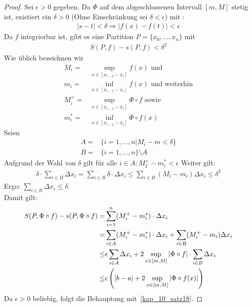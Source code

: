 \begin{proof}	
	 Sei $\epsilon > 0$ gegeben. Da $\Phi$ auf dem abgeschlossenen Intervall 
	$[m,M]$ stetig ist, existiert ein $\delta > 0$ 
	(Ohne Einschränkung sei $\delta < \epsilon$) mit :
	\begin{align*}
		\vert s - t\vert < \delta \Rightarrow \vert f(x) - f(t) \vert < \epsilon
	\end{align*}
	Da $f$ integrierbar ist, gibt es eine Partition $P = \{x_0, \hdots, x_n\}$
	mit 
	\begin{align*}
		S(P,f) - s(P,f) < \delta^2
	\end{align*}		
	Wie üblich bezeichnen wir 
	\begin{align*}
		M_i = & \sup_{x \in [x_{i-1}-x_i]} f(x) \text{ und } \\
		m_i = & \inf_{x \in [x_{i-1}-x_i]} f(x) \text{ und weiterhin} \\
		M_i^+ = & \sup_{x \in [x_{i-1}-x_i]} \Phi \circ f \text{ sowie } \\
		m_i^* = & \inf_{x \in [x_{i-1}-x_i]} \Phi \circ f(x)
	\end{align*}		
	Seien
	\begin{align*}
		A = & \{i = 1, \hdots, n \vert M_i -m < \delta \} \\
		B = & \{ i = 1, \hdots, n\} \setminus A
	\end{align*}
	Aufgrund der Wahl von $\delta$ gilt für alle $ i \in A: M_I^+ - m_i^* < \epsilon$
	Weiter gilt: 
	\begin{align*}
		\delta \cdot \sum_{i \in B} \Delta x_i = \sum_{i \in B} \delta \cdot \Delta x_i 
		\leq  \sum_{i \in B} (M_i - m_i) \Delta x_i \leq \delta^2
	\end{align*}
	Ergo: $\sum_{i \in B} \Delta x_i \leq \delta$. \\
	Damit gilt:
	\begin{align*}
		S(P, \Phi \circ f) - s(P, \Phi \circ f) = 
		& \sum_{i = 1}^n (M_i^+ - m_i^*) \cdot\Delta x_i  \\
		= & \sum_{i \in A} (M_i^+ - m_i^* ) \cdot \Delta x_i + 
			\sum_{i \in B} (M_i^+ -m_i) \Delta x_i \\
		\leq & \epsilon \sum_{i \in A}\Delta x_i + 2 \sup_{x \in [m,M]} \abs{
			\Phi \circ f} \cdot \sum_{i \in B} \Delta x_i \\
		\leq & \epsilon \left(|b-a| + 2\sup_{x \in [m,M]} \abs{\Phi \circ f(x)}\right)
	\end{align*}
	Da $\epsilon > 0$ beliebig, folgt die Behauptung mit~\ref{kap_10_satz18}.
\end{proof}

